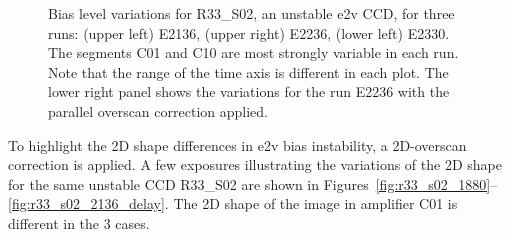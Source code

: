 \begin{figure}[htbp]
\begin{minipage}[b]{0.45\textwidth}
\end{minipage}
\caption{Bias level variations for R33\_S02, an unstable e2v CCD, for three runs:  (upper left) E2136, (upper right) E2236, (lower left) E2330.  The segments C01 and C10 are most strongly variable in each run.  Note that the range of the time axis is different in each plot. The lower right panel shows the variations for the run E2236 with the parallel overscan correction applied.}
\label{fig:r33_s02_bias}
\end{figure}

To highlight the 2D shape differences in e2v bias instability, a 2D-overscan correction
is applied. A few exposures illustrating the variations of the 2D shape
for the same unstable CCD R33\_S02 are shown in Figures~\ref{fig:r33_s02_1880}--\ref{fig:r33_s02_2136_delay}. The 2D shape of the image in
amplifier C01 is different in the 3 cases.

